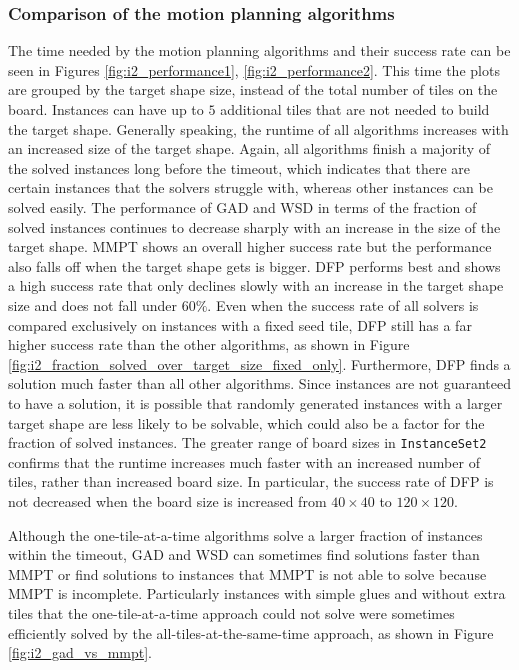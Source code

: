 \subsubsection{Comparison of the motion planning algorithms}

The time needed by the motion planning algorithms and their success rate can be seen in Figures \ref{fig:i2_performance1}, \ref{fig:i2_performance2}. This time the plots are grouped by the target shape size, instead of the total number of tiles on the board. Instances can have up to $5$ additional tiles that are not needed to build the target shape. Generally speaking, the runtime of all algorithms increases with an increased size of the target shape. Again, all algorithms finish a majority of the solved instances long before the timeout, which indicates that there are certain instances that the solvers struggle with, whereas other instances can be solved easily.
The performance of GAD and WSD in terms of the fraction of solved instances continues to decrease sharply with an increase in the size of the target shape. MMPT shows an overall higher success rate but the performance also falls off when the target shape gets is bigger. DFP performs best and shows a high success rate that only declines slowly with an increase in the target shape size and does not fall under $60\%$. Even when the success rate of all solvers is compared exclusively on instances with a fixed seed tile, DFP still has a far higher success rate than the other algorithms, as shown in Figure \ref{fig:i2_fraction_solved_over_target_size_fixed_only}. Furthermore, DFP finds a solution much faster than all other algorithms. Since instances are not guaranteed to have a solution, it is possible that randomly generated instances with a larger target shape are less likely to be solvable, which could also be a factor for the fraction of solved instances.
The greater range of board sizes in \texttt{InstanceSet2} confirms that the runtime increases much faster with an increased number of tiles, rather than increased board size. In particular, the success rate of DFP is not decreased when the board size is increased from $40 \times 40$ to $120 \times 120$. \par
Although the one-tile-at-a-time algorithms solve a larger fraction of instances within the timeout, GAD and WSD can sometimes find solutions faster than MMPT or find solutions to instances that MMPT is not able to solve because MMPT is incomplete. Particularly instances with simple glues and without extra tiles that the one-tile-at-a-time approach could not solve were sometimes efficiently solved by the all-tiles-at-the-same-time approach, as shown in Figure \ref{fig:i2_gad_vs_mmpt}.\par
